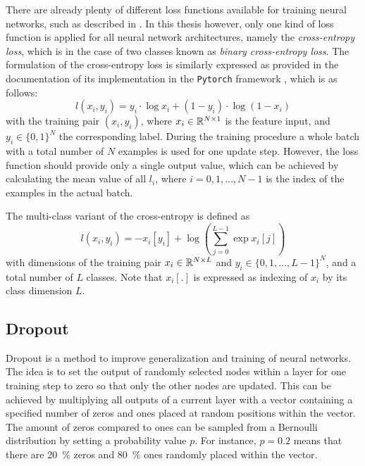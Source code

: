 There are already plenty of different loss functions available for training neural networks, such as described in \cite{LeCun2006}. 
In this thesis however, only one kind of loss function is applied for all neural network architectures, namely the \emph{cross-entropy loss}, which is in the case of two classes known as \emph{binary cross-entropy loss}.
The formulation of the cross-entropy loss is similarly expressed as provided in the documentation of its implementation in the \texttt{Pytorch} framework \cite{Pytorch}, which is as follows:
\begin{equation}\label{eq:nn_theory_binary_cross_entropy}
  l(x_i, y_i) = y_i \cdot \log x_i + (1 - y_i) \cdot \log (1 - x_i)
\end{equation}
with the training pair $(x_i, y_i)$, where $x_i \in \mathbb{R}^{N \times 1}$ is the feature input, and $y_i \in \{0, 1\}^N$ the corresponding label.
During the training procedure a whole batch with a total number of $N$ examples is used for one update step.
However, the loss function should provide only a single output value, which can be achieved by calculating the mean value of all $l_i$, where $i = 0, 1, \dots, N - 1$ is the index of the examples in the actual batch.

The multi-class variant of the cross-entropy is defined as
\begin{equation}
  l(x_i, y_i) = - x_i[y_i] + \log{\left( \sum_{j=0}^{L-1} \exp{x_i[j]} \right)}
\end{equation}
with dimensions of the training pair $x_i \in \mathbb{R}^{N \times L}$ and $y_i \in \{0, 1, \dots, L - 1\}^N$, and a total number of $L$ classes.
Note that $x_i[.]$ is expressed as indexing of $x_i$ by its class dimension $L$.



\subsection{Dropout}
Dropout \cite{Hinton2012} is a method to improve generalization and training of neural networks.
The idea is to set the output of randomly selected nodes within a layer for one training step to zero so that only the other nodes are updated.
This can be achieved by multiplying all outputs of a current layer with a vector containing a specified number of zeros and ones placed at random positions within the vector.
The amount of zeros compared to ones can be sampled from a Bernoulli distribution by setting a probability value $p$.
For instance, $p=0.2$ means that there are \SI{20}{\percent} zeros and \SI{80}{\percent} ones randomly placed within the vector.


